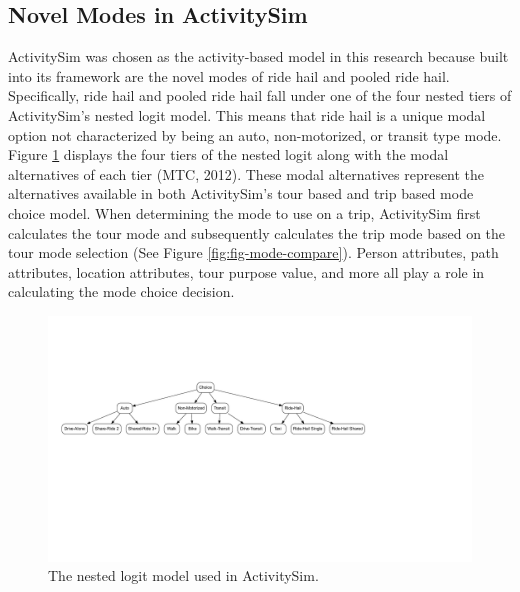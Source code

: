 \documentclass[fancy, masters]{byuthesis}
\begin{document}
\hypertarget{novel-modes-in-activitysim}{%
\subsection{Novel Modes in ActivitySim}\label{novel-modes-in-activitysim}}

ActivitySim was chosen as the activity-based model in this research because built into its framework are the novel modes of ride hail and pooled ride hail. Specifically, ride hail and pooled ride hail fall under one of the four nested tiers of ActivitySim's nested logit model. This means that ride hail is a unique modal option not characterized by being an auto, non-motorized, or transit type mode. Figure \ref{fig:fig-asim-nest} displays the four tiers of the nested logit along with the modal alternatives of each tier (MTC, 2012). These modal alternatives represent the alternatives available in both ActivitySim's tour based and trip based mode choice model. When determining the mode to use on a trip, ActivitySim first calculates the tour mode and subsequently calculates the trip mode based on the tour mode selection (See Figure \ref{fig:fig-mode-compare}). Person attributes, path attributes, location attributes, tour purpose value, and more all play a role in calculating the mode choice decision.

\begin{figure}

{\centering \includegraphics[width=.7\textwidth,trim = {5cm 6.5cm 12.5cm 4cm}]{thesis_files/figure-latex/fig-asim-nest-1} 

}

\caption{The nested logit model used in ActivitySim.}\label{fig:fig-asim-nest}
\end{figure}
\end{document}
